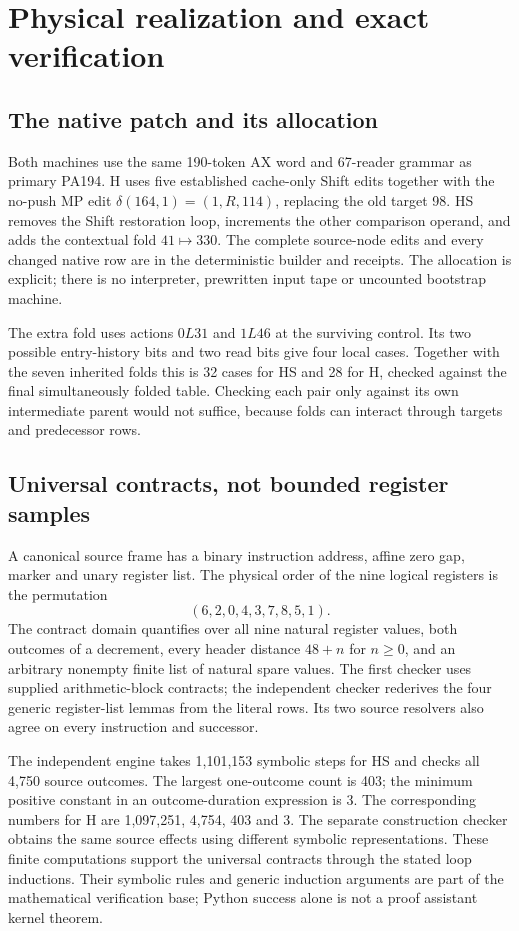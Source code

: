 \documentclass[11pt,letterpaper]{article}
\begin{document}
\section{Physical realization and exact verification}
\label{sec:physical}

\subsection{The native patch and its allocation}

Both machines use the same 190-token AX word and 67-reader grammar as
primary PA194. H uses five established cache-only Shift edits together
with the no-push MP edit $\delta(164,1)=(1,R,114)$, replacing the old
target 98. HS removes the Shift restoration loop, increments the other
comparison operand, and adds the contextual fold $41\mapsto330$.
The complete source-node edits and every changed native row are in the
deterministic builder and receipts. The allocation is explicit; there is
no interpreter, prewritten input tape or uncounted bootstrap machine.

The extra fold uses actions $0L31$ and $1L46$ at the surviving control.
Its two possible entry-history bits and two read bits give four local
cases. Together with the seven inherited folds this is 32 cases for HS
and 28 for H, checked against the final simultaneously folded table.
Checking each pair only against its own intermediate parent would not
suffice, because folds can interact through targets and predecessor rows.

\subsection{Universal contracts, not bounded register samples}

A canonical source frame has a binary instruction address, affine zero
gap, marker and unary register list. The physical order of the nine
logical registers is the permutation
\[
 (6,2,0,4,3,7,8,5,1).
\]
The contract domain quantifies over all nine natural register values,
both outcomes of a decrement, every header distance $48+n$ for $n\ge0$,
and an arbitrary nonempty finite list of natural spare values. The first
checker uses supplied arithmetic-block contracts; the independent checker
rederives the four generic register-list lemmas from the literal rows.
Its two source resolvers also agree on every instruction and successor.

The independent engine takes 1,101,153 symbolic steps for HS and checks
all 4,750 source outcomes. The largest one-outcome count is 403; the
minimum positive constant in an outcome-duration expression is 3.
The corresponding numbers for H are 1,097,251, 4,754, 403 and 3.
The separate construction checker obtains the same source effects using
different symbolic representations. These finite computations support
the universal contracts through the stated loop inductions. Their
symbolic rules and generic induction arguments are part of the
mathematical verification base; Python success alone is not a proof
assistant kernel theorem.
\end{document}
